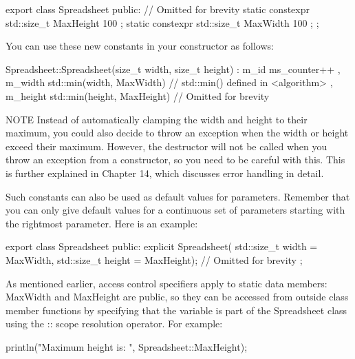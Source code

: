 \begin{cpp}
export class Spreadsheet
{
    public:
        // Omitted for brevity
        static constexpr std::size_t MaxHeight { 100 };
        static constexpr std::size_t MaxWidth { 100 };
};
\end{cpp}

You can use these new constants in your constructor as follows:

\begin{cpp}
Spreadsheet::Spreadsheet(size_t width, size_t height)
    : m_id { ms_counter++ }
    , m_width { std::min(width, MaxWidth) } // std::min() defined in <algorithm>
    , m_height { std::min(height, MaxHeight) }
{
    // Omitted for brevity
}
\end{cpp}

\begin{myNotic}{NOTE}
Instead of automatically clamping the width and height to their maximum, you could also decide to throw an exception when the width or height exceed their maximum. However, the destructor will not be called when you throw an exception from a constructor, so you need to be careful with this. This is further explained in Chapter 14, which discusses error handling in detail.
\end{myNotic}

Such constants can also be used as default values for parameters. Remember that you can only give default values for a continuous set of parameters starting with the rightmost parameter. Here is an example:

\begin{cpp}
export class Spreadsheet
{
    public:
        explicit Spreadsheet(
            std::size_t width = MaxWidth, std::size_t height = MaxHeight);
        // Omitted for brevity
};
\end{cpp}


As mentioned earlier, access control specifiers apply to static data members: MaxWidth and MaxHeight are public, so they can be accessed from outside class member functions by specifying that the variable is part of the Spreadsheet class using the :: scope resolution operator. For example:

\begin{cpp}
println("Maximum height is: {}", Spreadsheet::MaxHeight);
\end{cpp}


